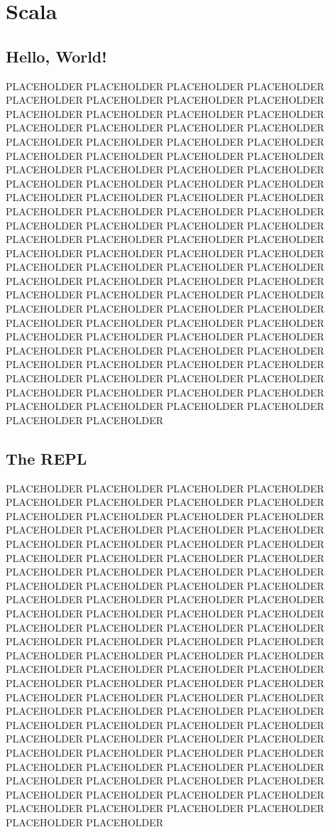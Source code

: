 \chapter{Scala}\label{ch:scala}

\section{Hello, World!}

PLACEHOLDER PLACEHOLDER PLACEHOLDER PLACEHOLDER PLACEHOLDER PLACEHOLDER PLACEHOLDER PLACEHOLDER PLACEHOLDER PLACEHOLDER PLACEHOLDER PLACEHOLDER PLACEHOLDER PLACEHOLDER PLACEHOLDER PLACEHOLDER PLACEHOLDER PLACEHOLDER PLACEHOLDER PLACEHOLDER PLACEHOLDER PLACEHOLDER PLACEHOLDER PLACEHOLDER PLACEHOLDER PLACEHOLDER PLACEHOLDER PLACEHOLDER PLACEHOLDER PLACEHOLDER PLACEHOLDER PLACEHOLDER PLACEHOLDER PLACEHOLDER PLACEHOLDER PLACEHOLDER PLACEHOLDER PLACEHOLDER PLACEHOLDER PLACEHOLDER PLACEHOLDER PLACEHOLDER PLACEHOLDER PLACEHOLDER PLACEHOLDER PLACEHOLDER PLACEHOLDER PLACEHOLDER PLACEHOLDER PLACEHOLDER PLACEHOLDER PLACEHOLDER PLACEHOLDER PLACEHOLDER PLACEHOLDER PLACEHOLDER PLACEHOLDER PLACEHOLDER PLACEHOLDER PLACEHOLDER PLACEHOLDER PLACEHOLDER PLACEHOLDER PLACEHOLDER PLACEHOLDER PLACEHOLDER PLACEHOLDER PLACEHOLDER PLACEHOLDER PLACEHOLDER PLACEHOLDER PLACEHOLDER PLACEHOLDER PLACEHOLDER PLACEHOLDER PLACEHOLDER PLACEHOLDER PLACEHOLDER PLACEHOLDER PLACEHOLDER PLACEHOLDER PLACEHOLDER PLACEHOLDER PLACEHOLDER PLACEHOLDER PLACEHOLDER PLACEHOLDER PLACEHOLDER PLACEHOLDER PLACEHOLDER PLACEHOLDER PLACEHOLDER PLACEHOLDER PLACEHOLDER PLACEHOLDER PLACEHOLDER PLACEHOLDER PLACEHOLDER


\section{The REPL}

PLACEHOLDER PLACEHOLDER PLACEHOLDER PLACEHOLDER PLACEHOLDER PLACEHOLDER PLACEHOLDER PLACEHOLDER PLACEHOLDER PLACEHOLDER PLACEHOLDER PLACEHOLDER PLACEHOLDER PLACEHOLDER PLACEHOLDER PLACEHOLDER PLACEHOLDER PLACEHOLDER PLACEHOLDER PLACEHOLDER PLACEHOLDER PLACEHOLDER PLACEHOLDER PLACEHOLDER PLACEHOLDER PLACEHOLDER PLACEHOLDER PLACEHOLDER PLACEHOLDER PLACEHOLDER PLACEHOLDER PLACEHOLDER PLACEHOLDER PLACEHOLDER PLACEHOLDER PLACEHOLDER PLACEHOLDER PLACEHOLDER PLACEHOLDER PLACEHOLDER PLACEHOLDER PLACEHOLDER PLACEHOLDER PLACEHOLDER PLACEHOLDER PLACEHOLDER PLACEHOLDER PLACEHOLDER PLACEHOLDER PLACEHOLDER PLACEHOLDER PLACEHOLDER PLACEHOLDER PLACEHOLDER PLACEHOLDER PLACEHOLDER PLACEHOLDER PLACEHOLDER PLACEHOLDER PLACEHOLDER PLACEHOLDER PLACEHOLDER PLACEHOLDER PLACEHOLDER PLACEHOLDER PLACEHOLDER PLACEHOLDER PLACEHOLDER PLACEHOLDER PLACEHOLDER PLACEHOLDER PLACEHOLDER PLACEHOLDER PLACEHOLDER PLACEHOLDER PLACEHOLDER PLACEHOLDER PLACEHOLDER PLACEHOLDER PLACEHOLDER PLACEHOLDER PLACEHOLDER PLACEHOLDER PLACEHOLDER PLACEHOLDER PLACEHOLDER PLACEHOLDER PLACEHOLDER PLACEHOLDER PLACEHOLDER PLACEHOLDER PLACEHOLDER PLACEHOLDER PLACEHOLDER PLACEHOLDER PLACEHOLDER PLACEHOLDER PLACEHOLDER


